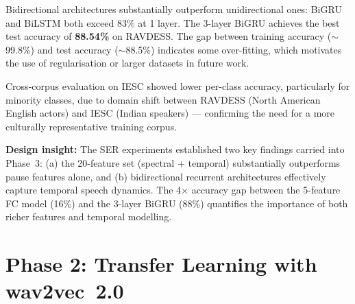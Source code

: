 \begin{table}[h]
\centering
\caption{RAVDESS test and train accuracy (\%) for 1D CNN + recurrent architectures (Model~3).}
\label{tab:ser_rnn}
\end{table}

Bidirectional architectures substantially outperform unidirectional ones: BiGRU and BiLSTM both exceed 83\% at 1 layer. The 3-layer BiGRU achieves the best test accuracy of \textbf{88.54\%} on RAVDESS. The gap between training accuracy ($\sim$99.8\%) and test accuracy ($\sim$88.5\%) indicates some over-fitting, which motivates the use of regularisation or larger datasets in future work.

Cross-corpus evaluation on IESC showed lower per-class accuracy, particularly for minority classes, due to domain shift between RAVDESS (North American English actors) and IESC (Indian speakers) — confirming the need for a more culturally representative training corpus.

\textbf{Design insight:} The SER experiments established two key findings carried into Phase~3: (a) the 20-feature set (spectral + temporal) substantially outperforms pause features alone, and (b) bidirectional recurrent architectures effectively capture temporal speech dynamics. The 4$\times$ accuracy gap between the 5-feature FC model (16\%) and the 3-layer BiGRU (88\%) quantifies the importance of both richer features and temporal modelling.

\section{Phase 2: Transfer Learning with wav2vec~2.0}

